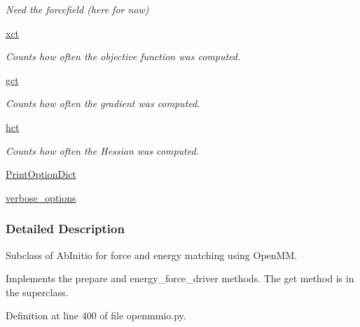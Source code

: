 \begin{DoxyCompactItemize}
\begin{DoxyCompactList}\small\item\em Need the forcefield (here for now) \end{DoxyCompactList}\item 
\hyperlink{classforcebalance_1_1target_1_1Target_aad2e385cfbf7b4a68f1c2cb41133fe82}{xct}
\begin{DoxyCompactList}\small\item\em Counts how often the objective function was computed. \end{DoxyCompactList}\item 
\hyperlink{classforcebalance_1_1target_1_1Target_aa625ac88c6744eb14ef281d9496d0dbb}{gct}
\begin{DoxyCompactList}\small\item\em Counts how often the gradient was computed. \end{DoxyCompactList}\item 
\hyperlink{classforcebalance_1_1target_1_1Target_a5b5a42f78052b47f29ed4b940c6111a1}{hct}
\begin{DoxyCompactList}\small\item\em Counts how often the Hessian was computed. \end{DoxyCompactList}\item 
\hyperlink{classforcebalance_1_1baseclass_1_1ForceBalanceBaseClass_a5c55e661e746d1a4443f4e0bc34ebe05}{Print\-Option\-Dict}
\item 
\hyperlink{classforcebalance_1_1baseclass_1_1ForceBalanceBaseClass_a8088e1e20cbd6bc175fb9c9fe9fa0f18}{verbose\-\_\-options}
\end{DoxyCompactItemize}


\subsubsection{Detailed Description}
Subclass of Ab\-Initio for force and energy matching using Open\-M\-M. 

Implements the prepare and energy\-\_\-force\-\_\-driver methods. The get method is in the superclass. 

Definition at line 400 of file openmmio.\-py.



